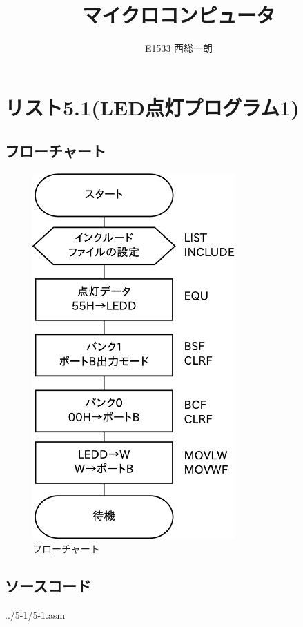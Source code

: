 \documentclass[a4paper,12pt]{ujarticle}
\begin{document}
\title{マイクロコンピュータ}
\author{E1533 西総一朗}
\maketitle
\clearpage
\tableofcontents
\clearpage
\section{リスト5.1(LED点灯プログラム1)}
  \subsection{フローチャート}
  \begin{figure}[htbp]
   \begin{center}
    \includegraphics[height=140mm]{Diagram5-1.eps}
   \end{center}
   \caption{フローチャート}
   \label{fig}
  \end{figure}
  \clearpage
  \subsection{ソースコード}
  \begin{lstinputlisting}[basicstyle=\ttfamily\footnotesize, frame=single]
   {../5-1/5-1.asm}
  \end{lstinputlisting}
\end{document}
